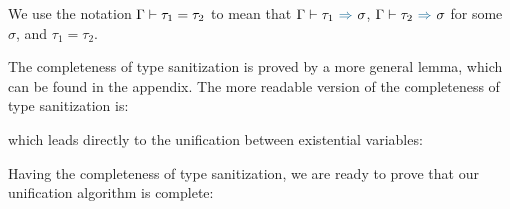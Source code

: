 We use the notation $\Gamma \vdash \tau_1 = \tau_2$ to mean that
$\tctx \byinf \tau_1 \infto \sigma$, $\tctx \byinf \tau_2 \infto \sigma$ for
some $\sigma$,
and $\tau_1 = \tau_2$.

The completeness of type sanitization is proved by a more general lemma, which
can be found in the appendix. The more readable version of the completeness of
type sanitization is:

\begin{corollary}[\TypeSanitizationCompletenessPrettyName]
  \label{lemma:\TypeSanitizationCompletenessPrettyName}
  \TypeSanitizationCompletenessPrettyBody
\end{corollary}

\noindent which leads directly to the unification between existential variables:

\begin{lemma}[\TypeSanitizationCompletenessUnificationName]\leavevmode
  \label{lemma:\TypeSanitizationCompletenessUnificationName}
  \TypeSanitizationCompletenessUnificationBody
\end{lemma}

Having the completeness of type sanitization, we are ready to prove that our
unification algorithm is complete:

\begin{lemma}[\UnificationCompletenessName]
  \label{lemma:\UnificationCompletenessName}
    \UnificationCompletenessBody
\end{lemma}
